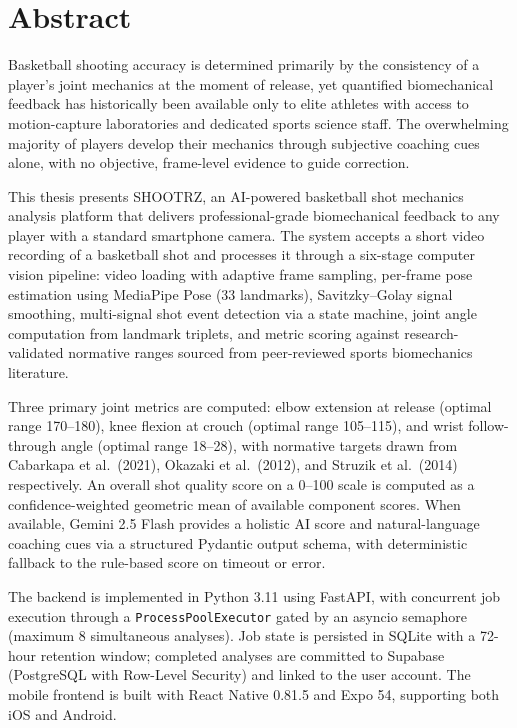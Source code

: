 \chapter*{Abstract}

Basketball shooting accuracy is determined primarily by the consistency of a player's joint mechanics at the moment of release, yet quantified biomechanical feedback has historically been available only to elite athletes with access to motion-capture laboratories and dedicated sports science staff. The overwhelming majority of players develop their mechanics through subjective coaching cues alone, with no objective, frame-level evidence to guide correction.

This thesis presents SHOOTRZ, an AI-powered basketball shot mechanics analysis platform that delivers professional-grade biomechanical feedback to any player with a standard smartphone camera. The system accepts a short video recording of a basketball shot and processes it through a six-stage computer vision pipeline: video loading with adaptive frame sampling, per-frame pose estimation using MediaPipe Pose (33 landmarks), Savitzky--Golay signal smoothing, multi-signal shot event detection via a state machine, joint angle computation from landmark triplets, and metric scoring against research-validated normative ranges sourced from peer-reviewed sports biomechanics literature.

Three primary joint metrics are computed: elbow extension at release (optimal range 170--180\textdegree), knee flexion at crouch (optimal range 105--115\textdegree), and wrist follow-through angle (optimal range 18--28\textdegree), with normative targets drawn from Cabarkapa et al.\ (2021), Okazaki et al.\ (2012), and Struzik et al.\ (2014) respectively. An overall shot quality score on a 0--100 scale is computed as a confidence-weighted geometric mean of available component scores. When available, Gemini 2.5 Flash provides a holistic AI score and natural-language coaching cues via a structured Pydantic output schema, with deterministic fallback to the rule-based score on timeout or error.

The backend is implemented in Python 3.11 using FastAPI, with concurrent job execution through a \texttt{ProcessPoolExecutor} gated by an asyncio semaphore (maximum 8 simultaneous analyses). Job state is persisted in SQLite with a 72-hour retention window; completed analyses are committed to Supabase (PostgreSQL with Row-Level Security) and linked to the user account. The mobile frontend is built with React Native 0.81.5 and Expo 54, supporting both iOS and Android.

